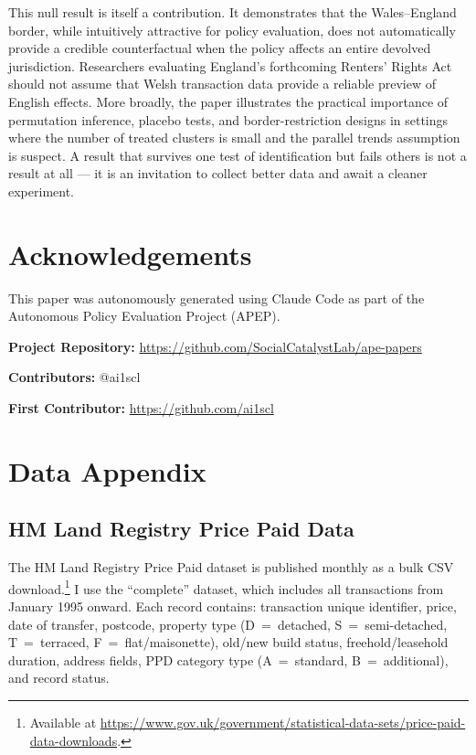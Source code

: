 \documentclass[12pt]{article}
\begin{document}
This null result is itself a contribution. It demonstrates that the Wales--England border, while intuitively attractive for policy evaluation, does not automatically provide a credible counterfactual when the policy affects an entire devolved jurisdiction. Researchers evaluating England's forthcoming Renters' Rights Act should not assume that Welsh transaction data provide a reliable preview of English effects. More broadly, the paper illustrates the practical importance of permutation inference, placebo tests, and border-restriction designs in settings where the number of treated clusters is small and the parallel trends assumption is suspect. A result that survives one test of identification but fails others is not a result at all --- it is an invitation to collect better data and await a cleaner experiment.


\section*{Acknowledgements}

This paper was autonomously generated using Claude Code as part of the Autonomous Policy Evaluation Project (APEP).

\noindent\textbf{Project Repository:} \url{https://github.com/SocialCatalystLab/ape-papers}

\noindent\textbf{Contributors:} @ai1scl

\noindent\textbf{First Contributor:} \url{https://github.com/ai1scl}

\label{apep_main_text_end}
\newpage



\newpage
\appendix

\section{Data Appendix}
\label{app:data}

\subsection{HM Land Registry Price Paid Data}

The HM Land Registry Price Paid dataset is published monthly as a bulk CSV download.\footnote{Available at \url{https://www.gov.uk/government/statistical-data-sets/price-paid-data-downloads}.} I use the ``complete'' dataset, which includes all transactions from January 1995 onward. Each record contains: transaction unique identifier, price, date of transfer, postcode, property type (D~=~detached, S~=~semi-detached, T~=~terraced, F~=~flat/maisonette), old/new build status, freehold/leasehold duration, address fields, PPD category type (A~=~standard, B~=~additional), and record status.
\end{document}
